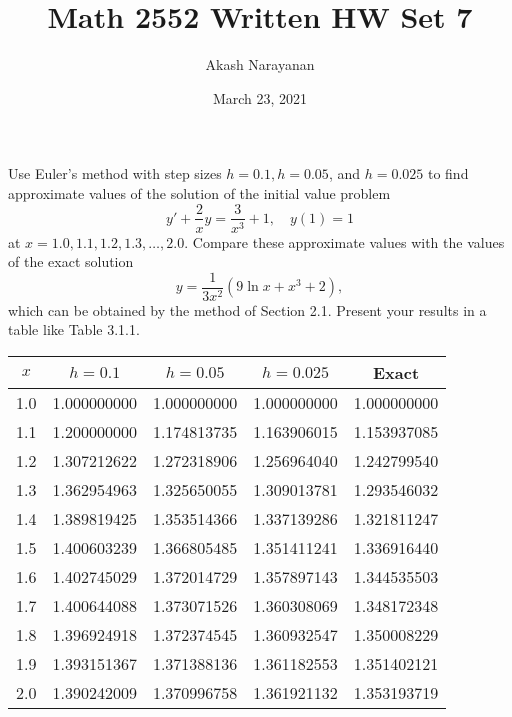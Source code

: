 \documentclass[11pt, titlepage]{article}
\title{Math 2552 Written HW Set 7}
\author{Akash Narayanan}
\date{March 23, 2021}
\begin{document}
    \maketitle

    \begin{problem}[Trench 3.1.7]
        Use Euler's method with step sizes $h = 0.1, h = 0.05$, and $h = 0.025$
        to find approximate values of the solution of the initial value problem
        \[
            y' + \frac{2}{x}y = \frac{3}{x^3} + 1, \quad y(1) = 1
        \] 
        at $x = 1.0, 1.1, 1.2, 1.3, \ldots, 2.0.$ Compare these approximate
        values with the values of the exact solution
        \[
            y = \frac{1}{3x^2}(9 \ln x + x^3 + 2),
        \] 
        which can be obtained by the method of Section 2.1. Present your results
        in a table like Table 3.1.1.
    \end{problem}

    \begin{center}
        \begin{tabular}{ |c|c|c|c|c| }
            \hline
            $x$ &     $h = 0.1$&    $h = 0.05$&   $h = 0.025$&        Exact \\
            \hline
            1.0 &  1.000000000 &  1.000000000 &  1.000000000 &  1.000000000 \\
            1.1 &  1.200000000 &  1.174813735 &  1.163906015 &  1.153937085 \\
            1.2 &  1.307212622 &  1.272318906 &  1.256964040 &  1.242799540 \\
            1.3 &  1.362954963 &  1.325650055 &  1.309013781 &  1.293546032 \\
            1.4 &  1.389819425 &  1.353514366 &  1.337139286 &  1.321811247 \\
            1.5 &  1.400603239 &  1.366805485 &  1.351411241 &  1.336916440 \\
            1.6 &  1.402745029 &  1.372014729 &  1.357897143 &  1.344535503 \\
            1.7 &  1.400644088 &  1.373071526 &  1.360308069 &  1.348172348 \\
            1.8 &  1.396924918 &  1.372374545 &  1.360932547 &  1.350008229 \\
            1.9 &  1.393151367 &  1.371388136 &  1.361182553 &  1.351402121 \\
            2.0 &  1.390242009 &  1.370996758 &  1.361921132 &  1.353193719 \\
            \hline
        \end{tabular}
    \end{center}
\end{document}
